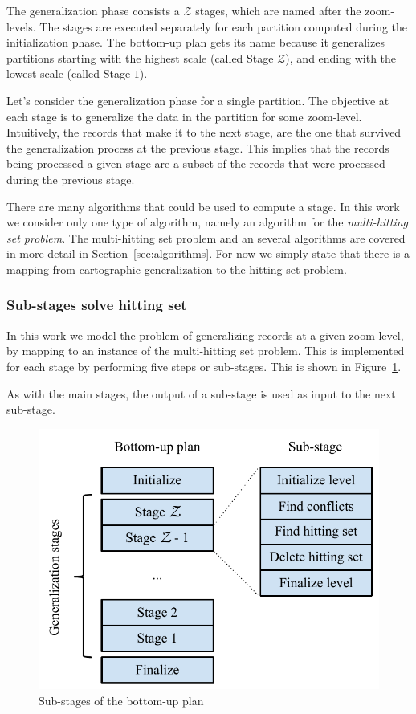 The generalization phase consists a $\mathcal{Z}$ stages, which are named after the zoom-levels. The stages are executed separately for each partition computed during the initialization phase. The bottom-up plan gets its name because it generalizes partitions starting with the highest scale (called Stage $\mathcal{Z}$), and ending with the lowest scale (called Stage $1$).

Let's consider the generalization phase for a single partition. The objective at each stage is to generalize the data in the partition for some zoom-level. Intuitively, the records that make it to the next stage, are the one that survived the generalization process at the previous stage. This implies that the records being processed a given stage are a subset of the records that were processed during the previous stage.

There are many algorithms that could be used to compute a stage. In this work we consider only one type of algorithm, namely an algorithm for the \emph{multi-hitting set problem}. The multi-hitting set problem and an several algorithms are covered in more detail in Section~\ref{sec:algorithms}. For now we simply state that there is a mapping from cartographic generalization to the hitting set problem.

\subsubsection{Sub-stages solve hitting set}
In this work we model the problem of generalizing records at a given zoom-level, by mapping to an instance of the multi-hitting set problem. This is implemented for each stage by performing five steps or sub-stages. This is shown in Figure~\ref{fig:stages}. 

As with the main stages, the output of a sub-stage is used as input to the next sub-stage.

\begin{figure}[htbp]
\begin{center}
\includegraphics[scale=.7]{figs/cvl_stages.pdf}
\caption{Sub-stages of the bottom-up plan}
\label{fig:stages}
\end{center}
\end{figure}
